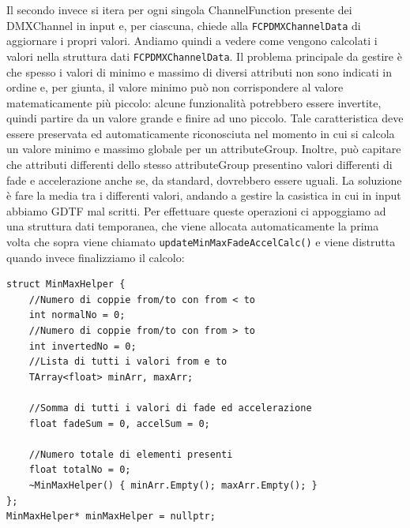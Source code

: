 \documentclass[main.tex]{subfiles}
\begin{document}
Il secondo invece si itera per ogni singola ChannelFunction presente dei DMXChannel in input e, per ciascuna, chiede alla \lstinline{FCPDMXChannelData} di aggiornare i propri valori. \newline
%
Andiamo quindi a vedere come vengono calcolati i valori nella struttura dati \lstinline{FCPDMXChannelData}. Il problema principale da gestire è che spesso i valori di minimo e massimo di diversi attributi non sono indicati in ordine e, per giunta, il valore minimo può non corrispondere al valore matematicamente più piccolo: alcune funzionalità potrebbero essere invertite, quindi partire da un valore grande e finire ad uno piccolo. Tale caratteristica deve essere preservata ed automaticamente riconosciuta nel momento in cui si calcola un valore minimo e massimo globale per un attributeGroup. Inoltre, può capitare che attributi differenti dello stesso attributeGroup presentino valori differenti di fade e accelerazione anche se, da standard, dovrebbero essere uguali. La soluzione è fare la media tra i differenti valori, andando a gestire la casistica in cui in input abbiamo GDTF mal scritti. Per effettuare queste operazioni ci appoggiamo ad una struttura dati temporanea, che viene allocata automaticamente la prima volta che sopra viene chiamato \lstinline{updateMinMaxFadeAccelCalc()} e viene distrutta quando invece finalizziamo il calcolo:
\begin{lstlisting}
struct MinMaxHelper {
    //Numero di coppie from/to con from < to
    int normalNo = 0;
    //Numero di coppie from/to con from > to
    int invertedNo = 0;
    //Lista di tutti i valori from e to
    TArray<float> minArr, maxArr;

    //Somma di tutti i valori di fade ed accelerazione
    float fadeSum = 0, accelSum = 0;

    //Numero totale di elementi presenti
    float totalNo = 0;
    ~MinMaxHelper() { minArr.Empty(); maxArr.Empty(); }
};
MinMaxHelper* minMaxHelper = nullptr;
\end{lstlisting}
\end{document}
